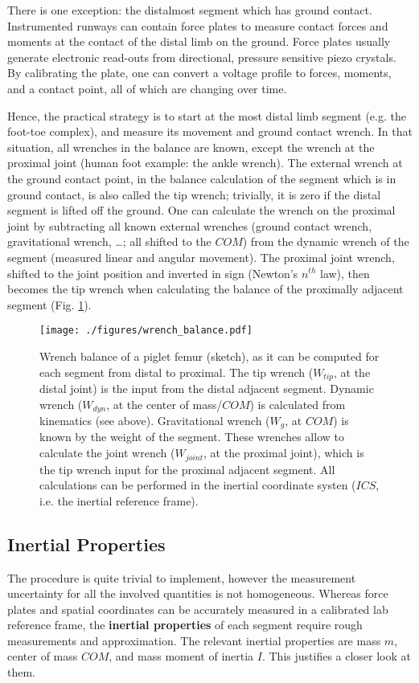 There is one exception: the distalmost segment which has ground contact.
Instrumented runways can contain force plates to measure contact forces and moments at the contact of the distal limb on the ground.
Force plates usually generate electronic read-outs from directional, pressure sensitive piezo crystals.
By calibrating the plate, one can convert a voltage profile to forces, moments, and a contact point, all of which are changing over time.


Hence, the practical strategy \citep{Robertson2013,Lynch2017,Dumas2004} is to start at the most distal limb segment (e.g. the foot-toe complex), and measure its movement and ground contact wrench.
In that situation, all wrenches in the balance are known, except the wrench at the proximal joint (human foot example: the ankle wrench).
The external wrench at the ground contact point, in the balance calculation of the segment which is in ground contact, is also called the tip wrench; trivially, it is zero if the distal segment is lifted off the ground.
One can calculate the wrench on the proximal joint by subtracting all known external wrenches (ground contact wrench, gravitational wrench, \ldots{}; all shifted to the \(COM\)) from the dynamic wrench of the segment (measured linear and angular movement).
The proximal joint wrench, shifted to the joint position and inverted in sign (Newton's \(n^{th}\) law), then becomes the tip wrench when calculating the balance of the proximally adjacent segment (Fig. \ref{fig:wrenchbalance}).

\begin{figure}[htbp]
\centering
\texttt{[image: ./figures/wrench\_balance.pdf]}
\caption{\label{fig:wrenchbalance}Wrench balance of a piglet femur (sketch), as it can be computed for each segment from distal to proximal. The tip wrench (\(W_{tip}\), at the distal joint) is the input from the distal adjacent segment. Dynamic wrench (\(W_{dyn}\), at the center of mass/\(COM\)) is calculated from kinematics (see above). Gravitational wrench (\(W_{g}\), at \(COM\)) is known by the weight of the segment. These wrenches allow to calculate the joint wrench (\(W_{joint}\), at the proximal joint), which is the tip wrench input for the proximal adjacent segment. All calculations can be performed in the inertial coordinate systen (\(ICS\), i.e. the inertial reference frame).}
\end{figure}


\subsection{Inertial Properties}
\label{sec:orgfd332dd}
The procedure is quite trivial to implement, however the measurement uncertainty for all the involved quantities is not homogeneous.
Whereas force plates and spatial coordinates can be accurately measured in a calibrated lab reference frame, the \textbf{inertial properties} of each segment require rough measurements and approximation.
The relevant inertial properties are mass \(m\), center of mass \(COM\), and mass moment of inertia \(I\).
This justifies a closer look at them.


